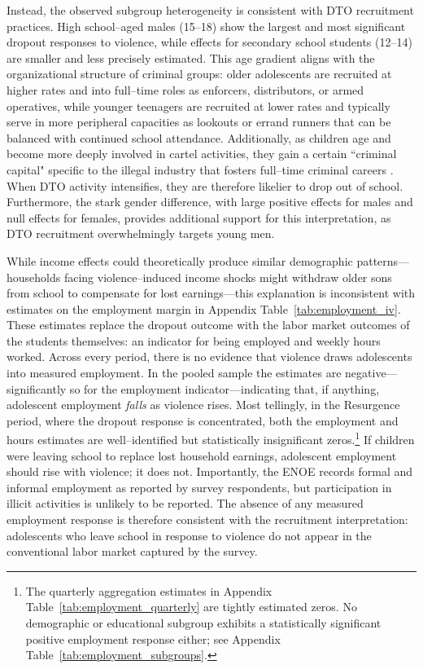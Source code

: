 \documentclass[12pt,letter,english,intoc,bibliography=totoc,index=totoc,BCOR10mm,captions=tableheading,nottitlepage,fleqn]{article}
\theoremstyle{break}
\begin{document}
Instead, the observed subgroup heterogeneity is consistent with DTO recruitment practices. High school--aged males (15--18) show the largest and most significant dropout responses to violence, while effects for secondary school students (12--14) are smaller and less precisely estimated. This age gradient aligns with the organizational structure of criminal groups: older adolescents are recruited at higher rates and into full--time roles as enforcers, distributors, or armed operatives, while younger teenagers are recruited at lower rates and typically serve in more peripheral capacities as lookouts or errand runners that can be balanced with continued school attendance. Additionally, as children age and become more deeply involved in cartel activities, they gain a certain ``criminal capital" specific to the illegal industry that fosters full--time criminal careers \citep{Sviatschi2022}. When DTO activity intensifies, they are therefore likelier to drop out of school. Furthermore, the stark gender difference, with large positive effects for males and null effects for females, provides additional support for this interpretation, as DTO recruitment overwhelmingly targets young men.

While income effects could theoretically produce similar demographic patterns---households facing violence--induced income shocks might withdraw older sons from school to compensate for lost earnings---this explanation is inconsistent with estimates on the employment margin in Appendix Table~\ref{tab:employment_iv}. These estimates replace the dropout outcome with the labor market outcomes of the students themselves: an indicator for being employed and weekly hours worked. Across every period, there is no evidence that violence draws adolescents into measured employment. In the pooled sample the estimates are negative---significantly so for the employment indicator---indicating that, if anything, adolescent employment \textit{falls} as violence rises. Most tellingly, in the Resurgence period, where the dropout response is concentrated, both the employment and hours estimates are well--identified but statistically insignificant zeros.\footnote{The quarterly aggregation estimates in Appendix Table~\ref{tab:employment_quarterly} are tightly estimated zeros. No demographic or educational subgroup exhibits a statistically significant positive employment response either; see Appendix Table~\ref{tab:employment_subgroups}.} If children were leaving school to replace lost household earnings, adolescent employment should rise with violence; it does not. Importantly, the ENOE records formal and informal employment as reported by survey respondents, but participation in illicit activities is unlikely to be reported. The absence of any measured employment response is therefore consistent with the recruitment interpretation: adolescents who leave school in response to violence do not appear in the conventional labor market captured by the survey.
\end{document}

